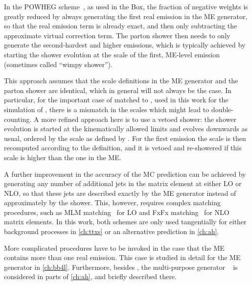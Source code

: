 In the POWHEG scheme~\cite{Powheg:2004,Powheg:2007}, as used in the \powheg Box, the fraction of negative weights is greatly reduced by always generating the first real emission in the ME generator, so that the real emission term is already exact, and then only subtracting the approximate virtual correction term. The parton shower then needs to only generate the second-hardest and higher emissions, which is typically achieved by starting the shower evolution at the scale of the first, ME-level emission (sometimes called ``wimpy shower'').


This approach assumes that the scale definitions in the ME generator and the parton shower are identical, which in general will not always be the case. In particular, for the important case of \powheg matched to \pythia, used in this work for the simulation of \pptt, there is a mismatch in the scales which might lead to double-counting. A more refined approach here is to use a vetoed shower: the shower evolution is started at the kinematically allowed limits and evolves downwards as usual, ordered by the scale as defined by \pythia. For the first emission the scale is then recomputed according to the \powheg definition, and it is vetoed and re-showered if this scale is higher than the one in the ME.

A further improvement in the accuracy of the MC prediction can be achieved by generating any number of additional jets in the matrix element at either LO or NLO, so that these jets are described exactly by the ME generator instead of approximately by the shower. This, however, requires complex matching procedures, such as MLM matching~\cite{Mangano:2006rw} for LO and FxFx matching~\cite{Frederix:2012ps} for NLO matrix elements. In this work, both schemes are only used tangentially for either background processes in \cref{ch:ttxs} or an alternative \ttbar prediction in \cref{ch:ah}.

More complicated procedures have to be invoked in the case that the ME contains more than one real emission. This case is studied in detail for the ME generator \bbfourl in \cref{ch:bb4l}. Furthermore, besides \pythia, the multi-purpose generator \herwig~\cite{Bellm:2015jjp,Bahr:2008pv} is considered in parts of \cref{ch:ah}, and briefly described there.

